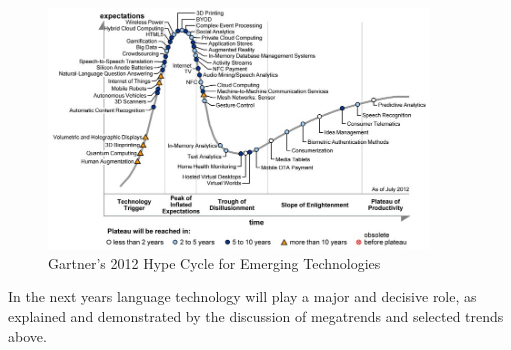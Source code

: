 \documentclass[10pt, plain]{../../metanetpaper}
\begin{document}
\begin{multicols}{2}
\begin{figure}[htb]
  \center
  \includegraphics[width=0.9\textwidth]{../_media/Gartner-2012-Hype-Cycle.jpeg}
  \caption{Gartner's 2012 Hype Cycle for Emerging Technologies \cite{gartner2012}}
  \label{fig:hype-cycle}
\end{figure}


In the next years language technology will play a major and decisive role, as explained and demonstrated by the discussion of megatrends and selected trends above. 


\end{multicols}
\end{document}
